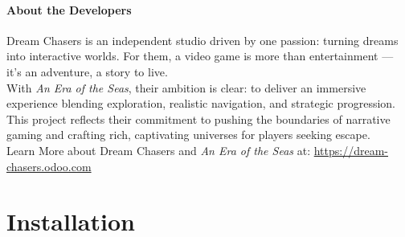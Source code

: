 \documentclass{article}
\begin{document}
\paragraph{About the Developers}\hfill

Dream Chasers is an independent studio driven by one passion: turning dreams into interactive worlds. For them, a video game is more than entertainment — it's an adventure, a story to live.\\

With \textit{An Era of the Seas}, their ambition is clear: to deliver an immersive experience blending exploration, realistic navigation, and strategic progression. This project reflects their commitment to pushing the boundaries of narrative gaming and crafting rich, captivating universes for players seeking escape.\\

\noindent Learn More about Dream Chasers and \textit{An Era of the Seas} at: \url{https://dream-chasers.odoo.com} 








\newpage
\section{Installation}\hfill
\end{document}
